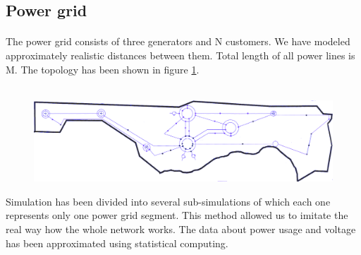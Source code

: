 \documentclass[a4paper]{article}
\begin{document}
\clearpage


\subsection{Power grid}
\label{sec:powerGrid}
\paragraph{}

The power grid consists of three generators and N customers. We have modeled approximately realistic distances between them. Total length of all power lines is M. The topology has been shown in figure \ref{fig:img3}.\\\\

\begin{figure}[h]
\centering
\includegraphics[scale=0.35]{schemas/img3.png}
\caption{\label{fig:img3}}
\end{figure}

Simulation has been divided into several sub-simulations of which each one represents only one power grid segment. This method allowed us to imitate the real way how the whole network works. The data about power usage and voltage has been approximated using statistical computing.

\end{document}
